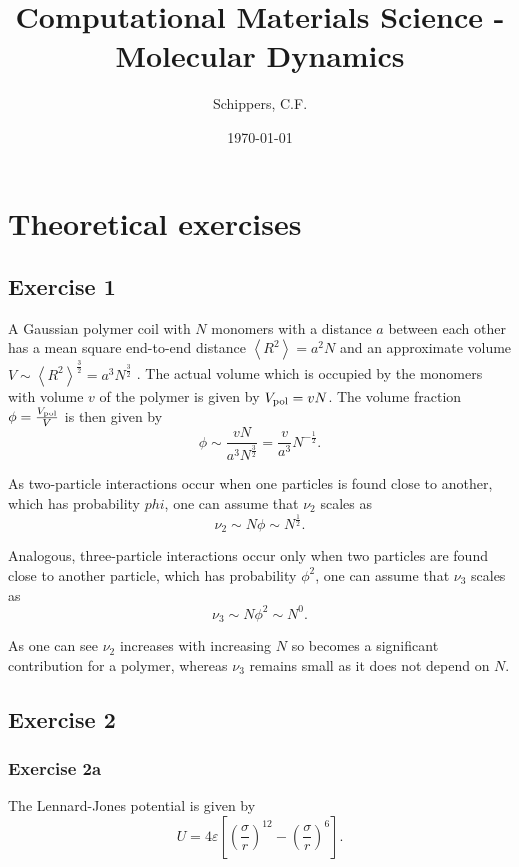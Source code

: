 \documentclass[titlepage]{report}
\title{Computational Materials Science - Molecular Dynamics}
\author{Schippers, C.F.}
\date{\today}
\begin{document}
\setAbstract{}
\inserttitletoc

\listoftodos
\newpage


\chapter{Theoretical exercises}
\section{Exercise 1}
A Gaussian polymer coil with $ N $ monomers with a distance $ a $ between each other has a mean square end-to-end distance $ \left\langle R^2 \right\rangle = a^2 N $ and an approximate volume $ V \sim \left\langle R^2 \right\rangle^{\frac{3}{2}} = a^3 N^{\frac{3}{2}} $ \parencite{Rubinstein2003}. The actual volume which is occupied by the monomers with volume $ v $ of the polymer is given by $ V_{\rm{pol}} = v N $. The volume fraction $ \phi = \frac{V_{\rm{pol}}}{V} $ is then given by
\begin{equation}
	\phi \sim \frac{v N}{a^3 N^{\frac{3}{2}}} = \frac{v}{a^3} N^{-\frac{1}{2}}.
\end{equation}

As two-particle interactions occur when one particles is found close to another, which has probability $ phi $, one can assume that $ \nu_2 $ scales as
\begin{equation}
	\nu_2 \sim N \phi \sim N^\frac{1}{2}.
\end{equation}

Analogous, three-particle interactions occur only when two particles are found close to another particle, which has probability $ \phi^2 $, one can assume that $ \nu_3 $ scales as
\begin{equation}
	\nu_3 \sim N \phi^2 \sim N^0.
\end{equation}

As one can see $ \nu_2 $ increases with increasing $ N $ so becomes a significant contribution for a polymer, whereas $ \nu_3 $ remains small as it does not depend on $ N $.

\section{Exercise 2}
\subsection{Exercise 2a}\label{subsec:THEX2a}
The Lennard-Jones potential is given by
\begin{equation}\label{eq:LennardJones}
	U = 4 \varepsilon \left[ \left(\frac{\sigma}{r}\right)^{12} - \left(\frac{\sigma}{r}\right)^6\right].
\end{equation}
\end{document}
